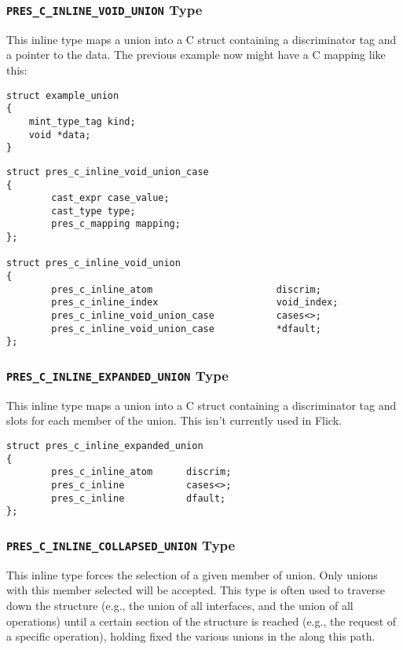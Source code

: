 \subsubsection{\texttt{PRES\_C\_INLINE\_VOID\_UNION} Type}

This inline type maps a \MINT{} union into a C struct containing a
discriminator tag and a  pointer to the data.  The previous
example now might have a C mapping like this:

\begin{verbatim}
struct example_union 
{
    mint_type_tag kind;
    void *data;
}
\end{verbatim}

\begin{verbatim}
struct pres_c_inline_void_union_case
{
        cast_expr case_value;
        cast_type type;
        pres_c_mapping mapping;
};

struct pres_c_inline_void_union
{
        pres_c_inline_atom                      discrim;
        pres_c_inline_index                     void_index;
        pres_c_inline_void_union_case           cases<>;
        pres_c_inline_void_union_case           *dfault;
};
\end{verbatim}

\subsubsection{\texttt{PRES\_C\_INLINE\_EXPANDED\_UNION} Type}

This inline type maps a \MINT{} union into a C struct containing a
discriminator tag and slots for each member of the union.  This isn't currently
used in Flick.

\begin{verbatim}
struct pres_c_inline_expanded_union
{
        pres_c_inline_atom      discrim;
        pres_c_inline           cases<>;
        pres_c_inline           dfault;
};
\end{verbatim}

\subsubsection{\texttt{PRES\_C\_INLINE\_COLLAPSED\_UNION} Type}

This inline type forces the selection of a given member of union.  Only unions
with this member selected will be accepted.  This type is often used to
traverse down the \MINT{} structure (e.g., the union of all interfaces, and the
union of all operations) until a certain section of the \MINT{} structure is
reached (e.g., the request of a specific operation), holding fixed the various
unions in the \MINT{} along this path.

